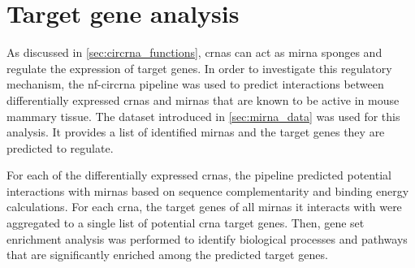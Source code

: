 \section{Target gene analysis}

As discussed in \cref{sec:circrna_functions}, \glspl{crna} can act as
\gls{mirna} sponges and regulate the expression of target genes.
In order to investigate this regulatory mechanism, the \gls{nf-circrna}
pipeline was used to predict interactions between differentially expressed
\glspl{crna} and \glspl{mirna} that are known to be active in mouse mammary
tissue.
The dataset introduced in \cref{sec:mirna_data} was used for this analysis.
It provides a list of identified \glspl{mirna} and the target genes they are
predicted to regulate.

For each of the differentially expressed \glspl{crna}, the pipeline predicted
potential interactions with \glspl{mirna} based on sequence complementarity and
binding energy calculations.
For each \gls{crna}, the target genes of all \glspl{mirna} it interacts with
were aggregated to a single list of potential \gls{crna} target genes.
Then, gene set enrichment analysis was performed to identify biological
processes and pathways that are significantly enriched among the predicted
target genes.



